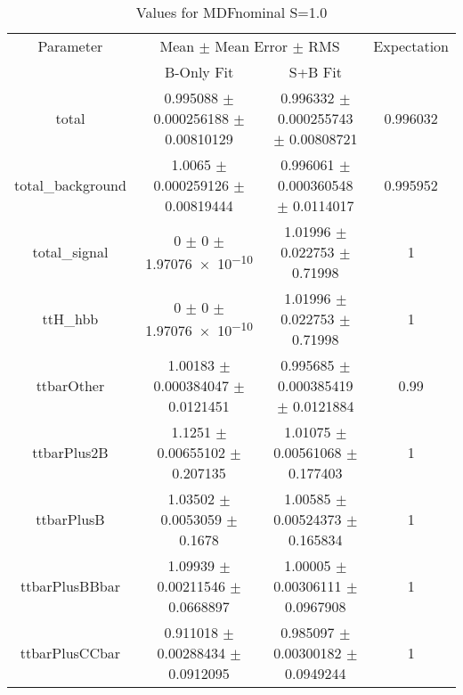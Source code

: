 \begin{table}
\centering
\caption{Values for MDFnominal S=1.0}
\begin{tabular}{cccc}
\toprule
Parameter & \multicolumn{2}{c}{Mean $\pm$ Mean Error $\pm$ RMS} & Expectation\\
 & B-Only Fit & S+B Fit & \\
\midrule
total & \num{0.995088} $\pm$ \num{0.000256188} $\pm$ \num{0.00810129} & \num{0.996332} $\pm$ \num{0.000255743} $\pm$ \num{0.00808721} & \num{0.996032}\\
total\_background & \num{1.0065} $\pm$ \num{0.000259126} $\pm$ \num{0.00819444} & \num{0.996061} $\pm$ \num{0.000360548} $\pm$ \num{0.0114017} & \num{0.995952}\\
total\_signal & \num{0} $\pm$ \num{0} $\pm$ \num{1.97076e-10} & \num{1.01996} $\pm$ \num{0.022753} $\pm$ \num{0.71998} & \num{1}\\
ttH\_hbb & \num{0} $\pm$ \num{0} $\pm$ \num{1.97076e-10} & \num{1.01996} $\pm$ \num{0.022753} $\pm$ \num{0.71998} & \num{1}\\
ttbarOther & \num{1.00183} $\pm$ \num{0.000384047} $\pm$ \num{0.0121451} & \num{0.995685} $\pm$ \num{0.000385419} $\pm$ \num{0.0121884} & \num{0.99}\\
ttbarPlus2B & \num{1.1251} $\pm$ \num{0.00655102} $\pm$ \num{0.207135} & \num{1.01075} $\pm$ \num{0.00561068} $\pm$ \num{0.177403} & \num{1}\\
ttbarPlusB & \num{1.03502} $\pm$ \num{0.0053059} $\pm$ \num{0.1678} & \num{1.00585} $\pm$ \num{0.00524373} $\pm$ \num{0.165834} & \num{1}\\
ttbarPlusBBbar & \num{1.09939} $\pm$ \num{0.00211546} $\pm$ \num{0.0668897} & \num{1.00005} $\pm$ \num{0.00306111} $\pm$ \num{0.0967908} & \num{1}\\
ttbarPlusCCbar & \num{0.911018} $\pm$ \num{0.00288434} $\pm$ \num{0.0912095} & \num{0.985097} $\pm$ \num{0.00300182} $\pm$ \num{0.0949244} & \num{1}\\
\bottomrule
\end{tabular}
\end{table}